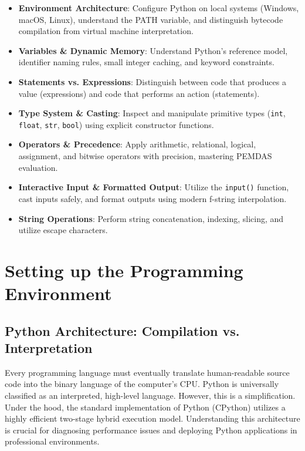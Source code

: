 \begin{itemize}[leftmargin=1.5em]
    \item \textbf{Environment Architecture}: Configure Python on local systems (Windows, macOS, Linux), understand the PATH variable, and distinguish bytecode compilation from virtual machine interpretation.
    \item \textbf{Variables \& Dynamic Memory}: Understand Python's reference model, identifier naming rules, small integer caching, and keyword constraints.
    \item \textbf{Statements vs. Expressions}: Distinguish between code that produces a value (expressions) and code that performs an action (statements).
    \item \textbf{Type System \& Casting}: Inspect and manipulate primitive types (\texttt{int}, \texttt{float}, \texttt{str}, \texttt{bool}) using explicit constructor functions.
    \item \textbf{Operators \& Precedence}: Apply arithmetic, relational, logical, assignment, and bitwise operators with precision, mastering PEMDAS evaluation.
    \item \textbf{Interactive Input \& Formatted Output}: Utilize the \texttt{input()} function, cast inputs safely, and format outputs using modern f-string interpolation.
    \item \textbf{String Operations}: Perform string concatenation, indexing, slicing, and utilize escape characters.
\end{itemize}

\section{Setting up the Programming Environment}

\subsection{Python Architecture: Compilation vs. Interpretation}

Every programming language must eventually translate human-readable source code into the binary language of the computer's CPU. Python is universally classified as an interpreted, high-level language. However, this is a simplification. Under the hood, the standard implementation of Python (CPython) utilizes a highly efficient two-stage hybrid execution model. Understanding this architecture is crucial for diagnosing performance issues and deploying Python applications in professional environments.

